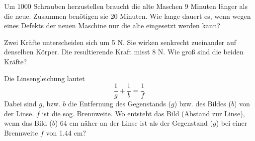 \begin{bbwAufgabenBlock}

\item Um 1000 Schrauben herzustellen braucht die alte Maschen 9
Minuten länger als die neue. Zusammen benötigen sie 20 Minuten. Wie
lange dauert es, wenn wegen eines Defekts der neuen Maschine nur die
alte eingesetzt werden kann?


\item  Zwei Kräfte unterscheiden sich um 5 N. Sie wirken senkrecht
zueinander auf denselben Körper. Die resultierende Kraft misst 8
N. Wie groß sind die beiden Kräfte?


\item Die Linsengleichung lautet
$$\frac1g + \frac1b = \frac1f$$
Dabei sind $g$, bzw. $b$ die Entfernung des Gegenstands ($g$) bzw. des
Bildes ($b$) von der  Linse. $f$ ist die sog. Brennweite.
Wo entsteht das Bild (Abstand zur Linse), wenn das Bild  ($b$)  64 cm 
näher an der Linse ist als der Gegenstand ($g$) bei einer Brennweite
$f$ von 1.44 cm?


\end{bbwAufgabenBlock}
\newpage



